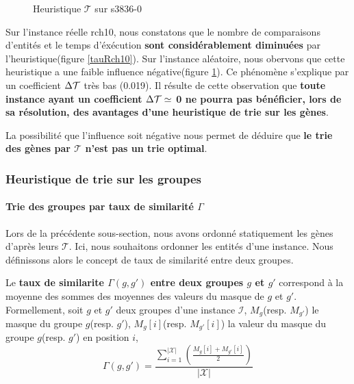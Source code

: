 \begin{figure}
\centering
	\begin{minipage}[c]{0.49\linewidth}
	\centering
	
	\end{minipage}
	\begin{minipage}[c]{0.49\linewidth}
	\centering
	
	\end{minipage}
\caption{Heuristique $\mathcal{T}$ sur s3836-0}
\label{taus3836}
\end{figure}

Sur l'instance réelle rch10, nous constatons que le nombre de comparaisons d'entités  et le temps d'éxécution \textbf{sont considérablement diminuées} par l'heuristique(figure \ref{tauRch10}). Sur l'instance aléatoire, nous obervons que cette heuristique a une faible influence négative(figure \ref{taus3836}). Ce phénomène s'explique par un coefficient $\Delta\cal{T}$ très bas (0.019). Il résulte de cette observation que \textbf{toute instance ayant un coefficient $\Delta\cal{T} \simeq $ 0 ne pourra pas bénéficier, lors de sa résolution, des avantages d'une heuristique de trie sur les gènes}.
 
La possibilité que l'influence soit négative nous permet de déduire que \textbf{le trie des gènes par $\mathcal{T}$ n'est pas un trie optimal}. 


\subsubsection{Heuristique de trie sur les groupes}
\paragraph{Trie des groupes par taux de similarité $\Gamma$}
Lors de la précédente sous-section, nous avons ordonné statiquement les gènes d'après leurs $\mathcal{T}$. Ici, nous souhaitons ordonner les entités d'une instance. Nous définissons alors le concept de taux de similarité entre deux groupes.

\begin{definition}
Le \textbf{taux de similarite $\Gamma(g,g')$ entre deux groupes $g$ et $g'$ } correspond à la moyenne des sommes des moyennes des valeurs du masque de $g$ et $g'$.\\
Formellement, soit $g$ et $g'$ deux groupes d'une instance $\mathcal{I}$, $M_g$(resp. $M_{g'}$) le masque du groupe $g$(resp. $g'$), $M_g[i]$(resp. $M_{g'}[i]$) la valeur du masque du groupe $g$(resp. $g'$) en position $i$,
$$ \Gamma(g,g')= \frac{\sum_{i=1}^{|\mathcal{X}|}(\frac{M_g[i]+M_{g'}[i]}{2})}{|\mathcal{X}|}$$
\end{definition}

